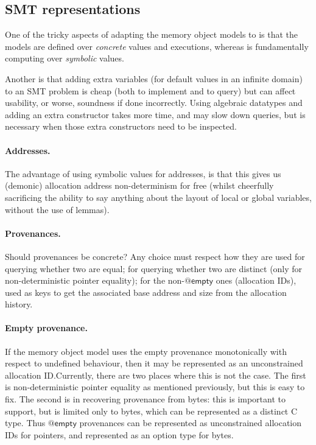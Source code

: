 \subsection{SMT representations}\label{subsec:smt-rep}

One of the tricky aspects of adapting the memory object models to  is
that the models are defined over \emph{concrete} values and executions, whereas
 is fundamentally computing over \emph{symbolic} values.

Another is that adding extra variables (for default values in an infinite
domain) to an SMT problem is cheap (both to implement and to query) but can
affect usability, or worse, soundness if done incorrectly. Using algebraic
datatypes and adding an extra constructor takes more time, and may slow down
queries, but is necessary when those extra constructors need to be inspected.

\paragraph{Addresses.}%
The advantage of using symbolic values for addresses, is that this gives us
(demonic) allocation address non-determinism for free (whilst cheerfully
sacrificing the ability to say anything about the layout of local or global
variables, without the use of lemmas).

\paragraph{Provenances.}%
Should provenances be concrete? Any choice must respect how they are used  \textemdash{}
for querying whether two are equal; for querying whether two are distinct (only
for non-deterministic pointer equality); for the non-$@\mathsf{empty}$ ones
(allocation IDs), used as keys to get the associated base address and size from
the allocation history.

\paragraph{Empty provenance.}%
If the memory object model uses the empty provenance monotonically with respect
to undefined behaviour, then it may be represented as an unconstrained
allocation ID.\@ Currently, there are two places where this is not the case.
The first is non-deterministic pointer equality as mentioned previously, but
this is easy to fix. The second is in recovering provenance from bytes: this
is important to support, but is limited only to bytes, which can be represented
as a distinct C type. Thus $@\mathsf{empty}$ provenances can be represented
as unconstrained allocation IDs for pointers,
and represented as an option type for bytes.

